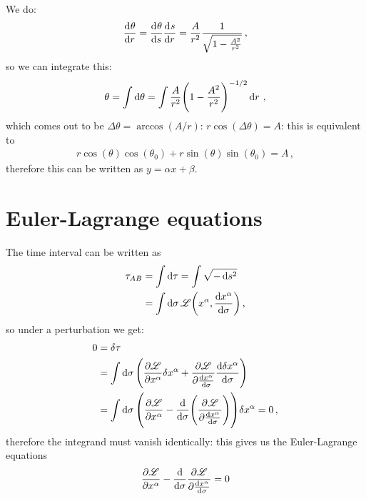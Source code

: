\documentclass[main.tex]{subfiles}
\begin{document}
We do: 
%
\begin{align}
  \dv[]{\theta }{r} = \dv[]{\theta }{s} \dv[]{s}{r} = \frac{A}{r^2} \frac{1}{\sqrt{1- \frac{A^2}{r^2}}}
\,,
\end{align}
%
so we can integrate this: 
%
\begin{align}
  \theta  = \int \dd{\theta } = \int
  \frac{A}{r^2} \qty(1 - \frac{A^2}{r^2})^{-1/2} \dd{r}
\,,
\end{align}
%
which comes out to be \(\Delta \theta  = \arccos (A/r)\): \(r\cos(\Delta \theta ) = A \): this is equivalent to 
%
\begin{align}
  r \cos(\theta ) \cos(\theta_0 ) + r \sin(\theta ) \sin(\theta_0 ) = A
\,,
\end{align}
%
therefore this can be written as \(y = \alpha x + \beta \).

\section{Euler-Lagrange equations}

The time interval can be written as 
%
\begin{subequations}
\begin{align}
  \tau_{AB} &= \int \dd{\tau } = \int \sqrt{-\dd{s^2}}  \\
  &= \int  \dd{\sigma } \mathscr{L} \qty(x^{\alpha }, \dv{x^{\alpha }}{\sigma }) 
\,,
\end{align}
\end{subequations}
%
so under a perturbation we get: 
%
\begin{subequations}
\begin{align}
  0 &= \delta \tau \\
  &= \int  \dd{\sigma } \qty(
      \pdv{\mathscr{L}}{x^{\alpha }} \delta x^{\alpha } 
      + \pdv{\mathscr{L}}{\dv{x^{\alpha }}{\sigma }} 
      \dv{ \delta x^{\alpha }}{\sigma }
  )  \\
  &= \int  \dd{\sigma } 
  \qty(
      \pdv{\mathscr{L}}{x^{\alpha }} - \dv{}{\sigma } \qty(\pdv[]{\mathscr{L}}{\dv{x^{\alpha }}{\sigma }})
  ) \delta x^{\alpha } =0
\,,
\end{align}
\end{subequations}
%
therefore the integrand must vanish identically: this gives us the Euler-Lagrange equations 
%
\begin{align}
  \pdv{\mathscr{L}}{x^{\alpha }} 
  - \dv{}{\sigma } 
  \pdv{\mathscr{L}}{\dv{x^{\alpha}}{\sigma }}=0
\end{align}
\end{document}
